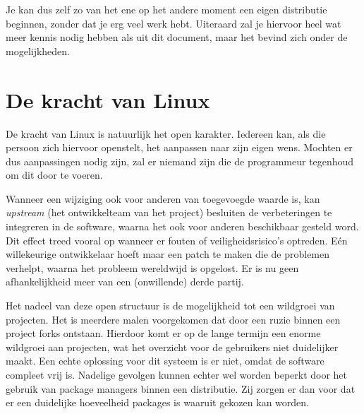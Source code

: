 Je kan dus zelf zo van het ene op het andere moment een  eigen distributie beginnen, zonder dat je erg veel werk hebt. Uiteraard zal je hiervoor heel wat meer kennis nodig hebben als uit dit document, maar het bevind zich onder de mogelijkheden.

\section{De kracht van Linux}
De kracht van Linux is natuurlijk het open karakter. Iedereen kan, als die persoon zich hiervoor openstelt, het aanpassen naar zijn eigen wens. Mochten er dus aanpassingen nodig zijn, zal er niemand zijn die de programmeur tegenhoud om dit door te voeren. 

Wanneer een wijziging ook voor anderen van toegevoegde waarde is, kan \emph{upstream} (het ontwikkelteam van het project) besluiten de verbeteringen te integreren in de software, waarna het ook voor anderen beschikbaar gesteld word. Dit effect treed vooral op wanneer er fouten of veiligheidsrisico's optreden. E\'{e}n willekeurige ontwikkelaar hoeft maar een patch te maken die de problemen verhelpt, waarna het probleem wereldwijd is opgelost. Er is nu geen afhankelijkheid meer van een (onwillende) derde partij. 

Het nadeel van deze open structuur is de mogelijkheid tot een wildgroei van projecten. Het is meerdere malen voorgekomen dat door een ruzie binnen een project forks ontstaan. Hierdoor komt er op de lange termijn een enorme wildgroei aan projecten, wat het overzicht voor de gebruikers niet duidelijker maakt. Een echte oplossing voor dit systeem is er niet, omdat de software compleet vrij is. Nadelige gevolgen kunnen echter wel worden beperkt door het gebruik van package managers binnen een distributie. Zij zorgen er dan voor dat er een duidelijke hoeveelheid packages is waaruit gekozen kan worden. 
